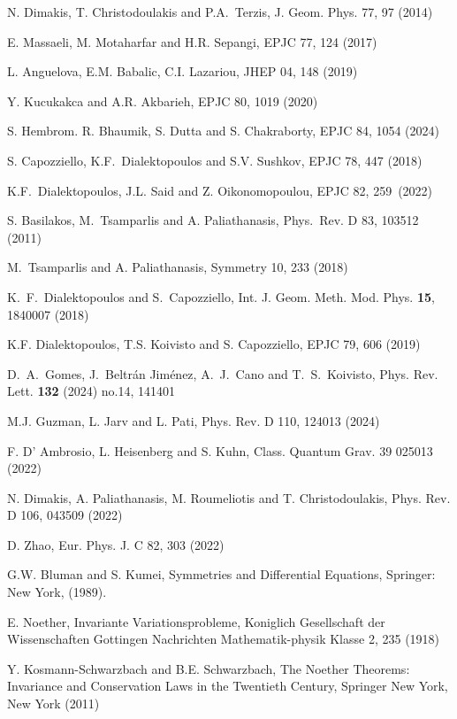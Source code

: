 \documentclass[onecolumn,superscriptaddress,secnumarabic,nobibnotes,aps,prd,nofootinbib,altaffilletter,11pt]{revtex4}
\begin{document}
\begin{thebibliography}{99}
 N. Dimakis, T. Christodoulakis and P.A.\ Terzis, J. Geom.
Phys. 77, 97 (2014)

 E. Massaeli, M. Motaharfar and H.R. Sepangi, EPJC 77, 124
(2017)

 L. Anguelova, E.M. Babalic, C.I. Lazariou, JHEP 04, 148 (2019)

 Y. Kucukakca and A.R. Akbarieh, EPJC 80, 1019 (2020)

 S. Hembrom. R. Bhaumik, S. Dutta and S. Chakraborty, EPJC 84,
1054 (2024)

 S. Capozziello, K.F.\ Dialektopoulos and S.V. Sushkov, EPJC
78, 447 (2018)

 K.F.\ Dialektopoulos, J.L. Said and Z. Oikonomopoulou, EPJC
82, 259\ (2022)

 S. Basilakos, M.\ Tsamparlis and A. Paliathanasis, Phys.\
Rev. D 83, 103512 (2011)

 M.\ Tsamparlis and A. Paliathanasis, Symmetry 10, 233 (2018)

K.~F.~Dialektopoulos and S.~Capozziello,
Int. J. Geom. Meth. Mod. Phys. \textbf{15}, 1840007 (2018)

 K.F. Dialektopoulos, T.S. Koivisto and S. Capozziello, EPJC
79, 606 (2019)

D.~A.~Gomes, J.~Beltr\'an Jim\'enez, A.~J.~Cano and T.~S.~Koivisto,
Phys. Rev. Lett. \textbf{132} (2024) no.14, 141401

 M.J. Guzman, L. Jarv and L. Pati, Phys. Rev. D 110, 124013 (2024)

 F. D' Ambrosio, L. Heisenberg and S. Kuhn, Class. Quantum
Grav. 39 025013 (2022)

 N. Dimakis, A. Paliathanasis, M. Roumeliotis and T.
Christodoulakis, Phys. Rev. D 106, 043509 (2022)

 D. Zhao, Eur. Phys. J. C 82, 303 (2022)

 G.W. Bluman and S. Kumei, Symmetries and Differential
Equations, Springer: New York, (1989).

 E. Noether, Invariante Variationsprobleme, Koniglich
Gesellschaft der Wissenschaften Gottingen Nachrichten Mathematik-physik
Klasse 2, 235 (1918)

 Y. Kosmann-Schwarzbach and B.E. Schwarzbach, The Noether
Theorems: Invariance and Conservation Laws in the Twentieth Century,
Springer New York, New York (2011)


\end{thebibliography}
\end{document}
